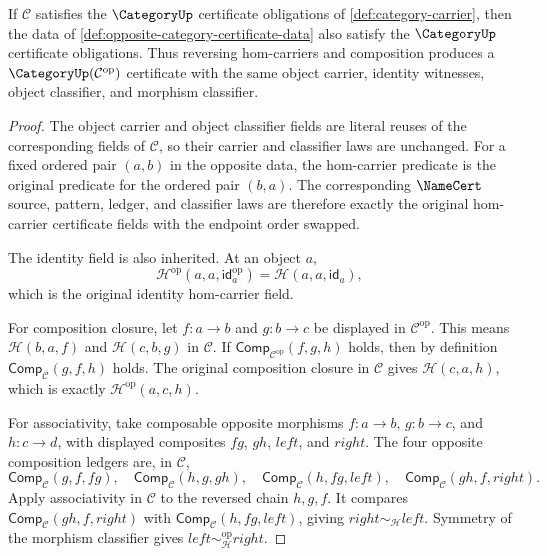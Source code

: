 \begin{theorem}
\label{thm:opposite-category-certificate}
If $\mathcal C$ satisfies the $\CategoryUp$ certificate obligations of
\autoref{def:category-carrier}, then the data of
\autoref{def:opposite-category-certificate-data} also satisfy the
$\CategoryUp$ certificate obligations. Thus reversing hom-carriers and
composition produces a $\CategoryUp(\mathcal C^{\mathrm{op}})$ certificate
with the same object carrier, identity witnesses, object classifier, and
morphism classifier.
\end{theorem}
\begin{proof}
The object carrier and object classifier fields are literal reuses of the
corresponding fields of $\mathcal C$, so their carrier and classifier laws are
unchanged. For a fixed ordered pair $(a,b)$ in the opposite data, the
hom-carrier predicate is the original predicate for the ordered pair $(b,a)$.
The corresponding $\NameCert$ source, pattern, ledger, and classifier laws are
therefore exactly the original hom-carrier certificate fields with the endpoint
order swapped.

The identity field is also inherited. At an object $a$,
$$
\mathcal H^{\mathrm{op}}(a,a,\mathsf{id}^{\mathrm{op}}_a)
=
\mathcal H(a,a,\mathsf{id}_a),
$$
which is the original identity hom-carrier field.

For composition closure, let $f:a\to b$ and $g:b\to c$ be displayed in
$\mathcal C^{\mathrm{op}}$. This means
$\mathcal H(b,a,f)$ and $\mathcal H(c,b,g)$ in $\mathcal C$. If
$\mathsf{Comp}_{\mathcal C^{\mathrm{op}}}(f,g,h)$ holds, then by definition
$\mathsf{Comp}_{\mathcal C}(g,f,h)$ holds. The original composition closure in
$\mathcal C$ gives $\mathcal H(c,a,h)$, which is exactly
$\mathcal H^{\mathrm{op}}(a,c,h)$.

For associativity, take composable opposite morphisms $f:a\to b$,
$g:b\to c$, and $h:c\to d$, with displayed composites $fg$, $gh$, $left$, and
$right$. The four opposite composition ledgers are, in $\mathcal C$,
$$
\mathsf{Comp}_{\mathcal C}(g,f,fg),\quad
\mathsf{Comp}_{\mathcal C}(h,g,gh),\quad
\mathsf{Comp}_{\mathcal C}(h,fg,left),\quad
\mathsf{Comp}_{\mathcal C}(gh,f,right).
$$
Apply associativity in $\mathcal C$ to the reversed chain $h,g,f$. It compares
$\mathsf{Comp}_{\mathcal C}(gh,f,right)$ with
$\mathsf{Comp}_{\mathcal C}(h,fg,left)$, giving
$right\sim_{\mathcal H}left$. Symmetry of the morphism classifier gives
$left\sim_{\mathcal H}^{\mathrm{op}}right$.


\end{proof}
